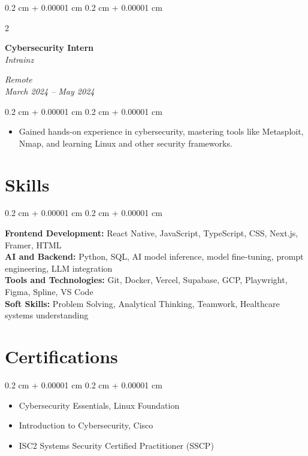 \documentclass[10pt, letterpaper]{article}
\newenvironment{highlights}{
    \begin{itemize}[
        topsep=0.10 cm,
        parsep=0.10 cm,
        partopsep=0pt,
        itemsep=0pt,
        leftmargin=0.4 cm + 10pt
    ]
}{
    \end{itemize}
} %
\newenvironment{onecolentry}{
    \begin{adjustwidth}{
        0.2 cm + 0.00001 cm
    }{
        0.2 cm + 0.00001 cm
    }
}{
    \end{adjustwidth}
} %
\newenvironment{twocolentry}[2][]{
    \onecolentry
    \def\secondColumn{#2}
    \setcolumnwidth{\fill, 4.5 cm}
    \begin{paracol}{2}
}{
    \switchcolumn \raggedleft \secondColumn
    \end{paracol}
    \endonecolentry
} %
\begin{document}
    \vspace{0.2 cm}
    \begin{twocolentry}{
        \textit{Remote} \\
        \textit{March 2024 – May 2024}
    }
        \textbf{Cybersecurity Intern} \\
        \textit{Intrainz}
    \end{twocolentry}
    \vspace{0.10 cm}
    \begin{onecolentry}
        \begin{highlights}
            \item Gained hands-on experience in cybersecurity, mastering tools like Metasploit, Nmap, and learning Linux and other security frameworks.
        \end{highlights}
    \end{onecolentry}

    \section{Skills}
    \begin{onecolentry}
        \textbf{Frontend Development:} React Native, JavaScript, TypeScript, CSS, Next.js, Framer, HTML \\
        \textbf{AI and Backend:} Python, SQL, AI model inference, model fine-tuning, prompt engineering, LLM integration \\
        \textbf{Tools and Technologies:} Git, Docker, Vercel, Supabase, GCP, Playwright, Figma, Spline, VS Code \\
        \textbf{Soft Skills:} Problem Solving, Analytical Thinking, Teamwork, Healthcare systems understanding
    \end{onecolentry}

    \section{Certifications}
    \begin{onecolentry}
        \begin{highlights}
            \item Cybersecurity Essentials, Linux Foundation
            \item Introduction to Cybersecurity, Cisco
            \item ISC2 Systems Security Certified Practitioner (SSCP)
        \end{highlights}
    \end{onecolentry}
\end{document}
